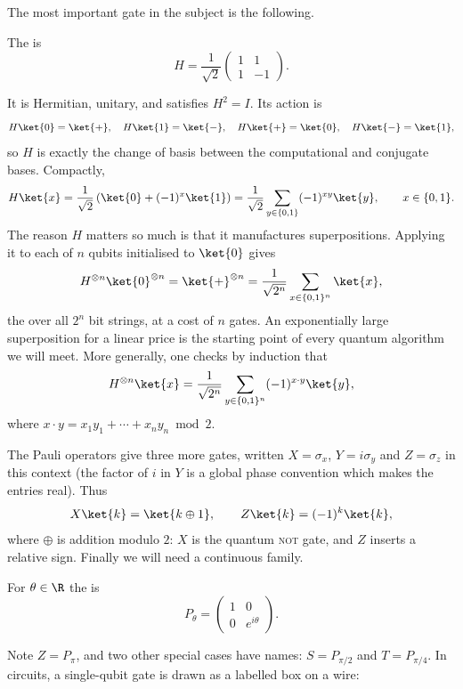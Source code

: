 The most important gate in the subject is the following.

\begin{definition}
	The  is
	$$H = \frac{1}{\sqrt2}\begin{pmatrix} 1 & 1 \\ 1 & -1\end{pmatrix}.$$
\end{definition}

It is Hermitian, unitary, and satisfies $H^2 = I$. Its action is
$$H\ket{0} = \ket{+}, \quad H\ket{1} = \ket{-}, \quad H\ket{+} = \ket{0},\quad H\ket{-} = \ket{1},$$
so $H$ is exactly the change of basis between the computational and conjugate bases. Compactly,
$$H\ket{x} = \frac{1}{\sqrt2}\left(\ket{0} + (-1)^x\ket{1}\right) = \frac{1}{\sqrt{2}}\sum_{y \in \{0,1\}}(-1)^{xy}\ket{y}, \qquad x \in \{0,1\}.$$
The reason $H$ matters so much is that it manufactures superpositions. Applying it to each of $n$ qubits initialised to $\ket{0}$ gives
$$H^{\otimes n}\ket{0}^{\otimes n} = \ket{+}^{\otimes n} = \frac{1}{\sqrt{2^n}}\sum_{x \in \{0,1\}^n}\ket{x},$$
the  over all $2^n$ bit strings, at a cost of $n$ gates. An exponentially large superposition for a linear price is the starting point of every quantum algorithm we will meet. More generally, one checks by induction that
$$H^{\otimes n}\ket{x} = \frac{1}{\sqrt{2^n}}\sum_{y\in\{0,1\}^n}(-1)^{x\cdot y}\ket{y},$$
where $x \cdot y = x_1y_1 + \cdots + x_ny_n \bmod 2$.

The Pauli operators give three more gates, written $X = \sigma_x$, $Y = i\sigma_y$ and $Z = \sigma_z$ in this context (the factor of $i$ in $Y$ is a global phase convention which makes the entries real). Thus
$$X\ket{k} = \ket{k\oplus 1}, \qquad Z\ket{k} = (-1)^k\ket{k},$$
where $\oplus$ is addition modulo $2$: $X$ is the quantum \textsc{not} gate, and $Z$ inserts a relative sign. Finally we will need a continuous family.

\begin{definition}
	For $\theta \in \R$ the  is
	$$P_\theta = \begin{pmatrix} 1 & 0 \\ 0 & e^{i\theta}\end{pmatrix}.$$
\end{definition}

Note $Z = P_\pi$, and two other special cases have names: $S = P_{\pi/2}$ and $T = P_{\pi/4}$. In circuits, a single-qubit gate is drawn as a labelled box on a wire:

